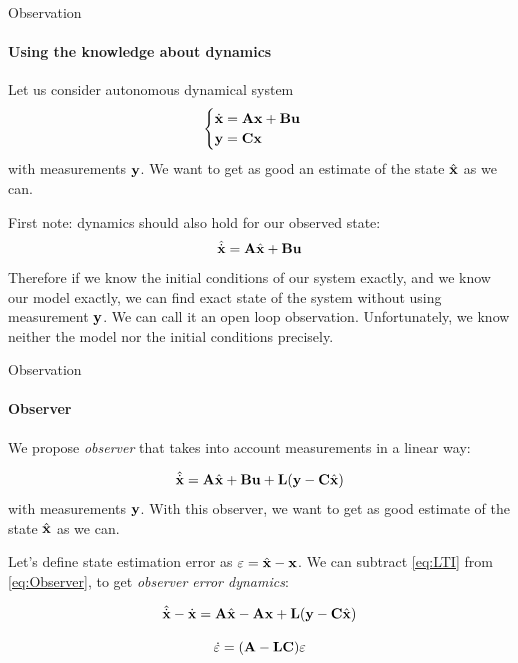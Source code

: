 \documentclass{beamer}
\begin{document}
\begin{frame}{Observation}
\framesubtitle{Using the knowledge about dynamics}
\begin{flushleft}

Let us consider autonomous dynamical system
\begin{equation}
\label{eq:LTI}
\begin{cases}
\dot {\mathbf{x}} = \mathbf{A} \mathbf{x} + \mathbf{B} \mathbf{u} \\
\mathbf{y} = \mathbf{C} \mathbf{x}
\end{cases}
\end{equation}
%
with measurements $\mathbf{y}$. We want to get as good an estimate of the state $\hat{\mathbf{x}}$ as we can.

\bigskip

First note: dynamics should also hold for our observed state:
\begin{equation}
\hat{\dot {\mathbf{x}}} = \mathbf{A} \hat{\mathbf{x}} + \mathbf{B} \mathbf{u}
\end{equation}
%
Therefore if we know the initial conditions of our system exactly, and we know our model exactly, we can find exact state of the system without using measurement $\mathbf{y}$. We can call it an open loop observation. Unfortunately, we know neither the model nor the initial conditions precisely.


\end{flushleft}
\end{frame}





\begin{frame}{Observation}
\framesubtitle{Observer}
\begin{flushleft}

We propose \emph{observer} that takes into account measurements in a linear way:

\begin{equation}
\label{eq:Observer}
\hat{\dot {\mathbf{x}}} = \mathbf{A} \hat{\mathbf{x}} + \mathbf{B} \mathbf u + \mathbf{L}(\mathbf y - \mathbf{C} \hat{\mathbf{x}})
\end{equation}
%
with measurements $\mathbf{y}$. With this observer, we want to get as good estimate of the state $\hat{\mathbf{x}}$ as we can.

\bigskip

Let's define state estimation error as $\varepsilon = \hat{\mathbf{x}} - \mathbf{x}$. We can subtract \eqref{eq:LTI} from \eqref{eq:Observer}, to get \emph{observer error dynamics}:

\begin{equation}
\hat{\dot {\mathbf{x}}} - \dot {\mathbf{x}}= 
\mathbf{A} \hat{\mathbf{x}} - \mathbf{A} \mathbf{x} + 
\mathbf{L}(\mathbf y - \mathbf{C} \hat{\mathbf{x}})
\end{equation}

\begin{equation}
\dot {\varepsilon}= 
(\mathbf{A} - \mathbf{L} \mathbf{C}) \varepsilon
\end{equation}

\end{flushleft}
\end{frame}
\end{document}
